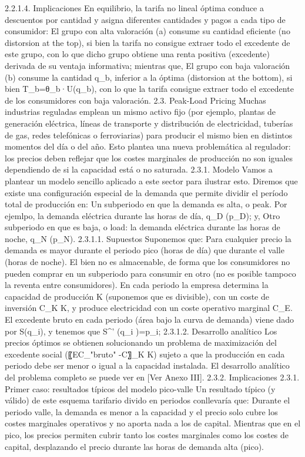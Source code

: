 \documentclass[10pt,a4paper]{article}
\begin{document}
 
2.2.1.4. Implicaciones
En equilibrio, la tarifa no lineal óptima conduce a descuentos por cantidad y asigna diferentes cantidades y pagos a cada tipo de consumidor:  
	El grupo con alta valoración (a) consume su cantidad eficiente (no distorsion at the top), si bien la tarifa no consigue extraer todo el excedente de este grupo, con lo que dicho grupo obtiene una renta positiva (excedente) derivada de su ventaja informativa; mientras que,
	El grupo con baja valoración (b) consume la cantidad q_b, inferior a la óptima (distorsion at the bottom), si bien T_b=θ_b·U(q_b), con lo que la tarifa consigue extraer todo el excedente de los consumidores con baja valoración. 
2.3. Peak-Load Pricing 
Muchas industrias reguladas emplean un mismo activo fijo (por ejemplo, plantas de generación eléctrica, líneas de transporte y distribución de electricidad, tuberías de gas, redes telefónicas o ferroviarias) para producir el mismo bien en distintos momentos del día o del año. Esto plantea una nueva problemática al regulador: los precios deben reflejar que los costes marginales de producción no son iguales dependiendo de si la capacidad está o no saturada.
2.3.1. Modelo
Vamos a plantear un modelo sencillo aplicado a este sector para ilustrar esto. Diremos que existe una configuración especial de la demanda que permite dividir el período total de producción en:
	Un subperiodo en que la demanda es alta, o peak. Por ejemlpo, la demanda eléctrica durante las horas de día, q_D (p_D); y,
	Otro subperiodo en que es baja, o load: la demanda eléctrica durante las horas de noche, q_N (p_N).
2.3.1.1. Supuestos
Suponemos que:
	Para cualquier precio la demanda es mayor durante el periodo pico (horas de día) que durante el valle (horas de noche).
	El bien no es almacenable, de forma que los consumidores no pueden comprar en un subperiodo para consumir en otro (no es posible tampoco la reventa entre consumidores). 
	En cada periodo la empresa determina la capacidad de producción K (suponemos que es divisible), con un coste de inversión C_K K, y produce electricidad con un coste operativo marginal C_E. 
	El excedente bruto en cada periodo (área bajo la curva de demanda) viene dado por S(q_i), y tenemos que S^' (q_i )=p_i;
2.3.1.2. Desarrollo analítico
Los precios óptimos se obtienen solucionando un problema de maximización del excedente social (〖EC_"bruto" -C〗_K K) sujeto a que la producción en cada periodo debe ser menor o igual a la capacidad instalada. El desarrollo analítico del problema completo se puede ver en [Ver Anexo III]. 
2.3.2. Implicaciones
2.3.1. Primer caso: resultados típicos del modelo pico-valle
Un resultado típico (y válido) de este esquema tarifario divido en periodos conllevaría que:
	Durante el periodo valle, la demanda es menor a la capacidad y el precio solo cubre los costes marginales operativos y no aporta nada a los de capital.  
	Mientras que en el pico, los precios permiten cubrir tanto los costes marginales como los costes de capital, desplazando el precio durante las horas de demanda alta (pico).
 
\end{document}
